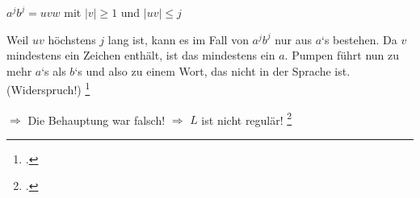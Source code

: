 \documentclass{lehramt-informatik-haupt}
\begin{document}
\begin{center}
$a^j b^j = uvw$ mit $|v| \geq 1$ und $|uv| \leq j$
\end{center}

\noindent
Weil $uv$ höchstens $j$ lang ist, kann es im Fall von $a^j b^j$ nur aus
$a$‘s bestehen. Da $v$ mindestens ein Zeichen enthält, ist das
mindestens ein $a$. Pumpen führt nun zu mehr $a$‘s als $b$‘s und also zu
einem Wort, das nicht in der Sprache ist. (Widerspruch!)
\footcite{wiki:pumping}

$\Rightarrow$ Die Behauptung war falsch!
$\Rightarrow$ $L$ ist nicht regulär!
\footcite[Seite 63-64]{theo:fs:1}

\literatur
\end{document}
